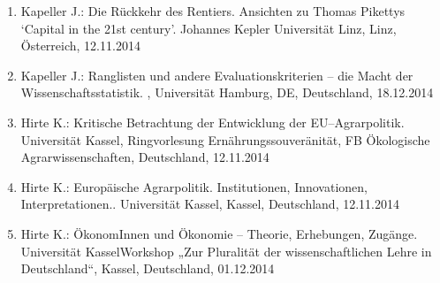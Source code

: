 \begin{enumerate}
	\item Kapeller J.: Die Rückkehr des Rentiers. Ansichten zu Thomas Pikettys ‘Capital in the 21st century’. Johannes Kepler Universität Linz, Linz, Österreich, 12.11.2014
	\item Kapeller J.: Ranglisten und andere Evaluationskriterien – die Macht der Wissenschaftsstatistik. , Universität Hamburg, DE, Deutschland, 18.12.2014
	\item Hirte K.: Kritische Betrachtung der Entwicklung der EU--Agrarpolitik. Universität Kassel, Ringvorlesung Ernährungssouveränität, FB Ökologische Agrarwissenschaften, Deutschland, 12.11.2014
	\item Hirte K.: Europäische Agrarpolitik. Institutionen, Innovationen, Interpretationen.. Universität Kassel, Kassel, Deutschland, 12.11.2014
	\item Hirte K.: ÖkonomInnen und Ökonomie – Theorie, Erhebungen, Zugänge. Universität KasselWorkshop „Zur Pluralität der wissenschaftlichen Lehre in Deutschland“, Kassel, Deutschland, 01.12.2014
\end{enumerate}
